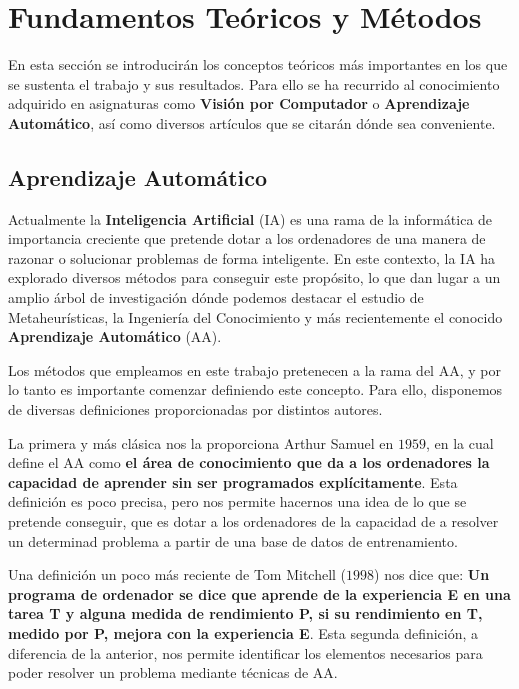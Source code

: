 
\chapter{Fundamentos Teóricos y Métodos}

En esta sección se introducirán los conceptos teóricos más importantes en los que se sustenta el trabajo y sus resultados. Para ello se ha recurrido al conocimiento adquirido en asignaturas como \textbf{Visión por Computador} o \textbf{Aprendizaje Automático}, así como diversos artículos que se citarán dónde sea conveniente.

\section{Aprendizaje Automático}
    \noindent Actualmente la \textbf{Inteligencia Artificial} (IA) es una rama de la informática de importancia creciente que pretende dotar a los ordenadores de una manera de razonar o solucionar problemas de forma inteligente. En este contexto, la IA ha explorado diversos métodos para conseguir este propósito, lo que dan lugar a un amplio árbol de investigación dónde podemos destacar el estudio de Metaheurísticas, la Ingeniería del Conocimiento y más recientemente el conocido \textbf{Aprendizaje Automático} (AA). 
    
    \medskip

    \noindent Los métodos que empleamos en este trabajo pretenecen a la rama del AA, y por lo tanto es importante comenzar definiendo este concepto. Para ello, disponemos de diversas definiciones proporcionadas por distintos autores.

    \medskip
    
    \noindent La primera y más clásica nos la proporciona Arthur Samuel en $1959$, en la cual define el AA como \textbf{el área de conocimiento que da a los ordenadores la capacidad de aprender sin ser programados explícitamente}. Esta definición es poco precisa, pero nos permite hacernos una idea de lo que se pretende conseguir, que es dotar a los ordenadores de la capacidad de  a resolver un determinad problema a partir de una base de datos de entrenamiento.
    
    \medskip
    
    \noindent Una definición un poco más reciente de Tom Mitchell ($1998$) nos dice que: \textbf{Un programa de ordenador se dice que aprende de la experiencia E en una tarea T y alguna medida de rendimiento P, si su rendimiento en T, medido por P, mejora con la experiencia E}. Esta segunda definición, a diferencia de la anterior, nos permite identificar los elementos necesarios para poder resolver un problema mediante técnicas de AA.

